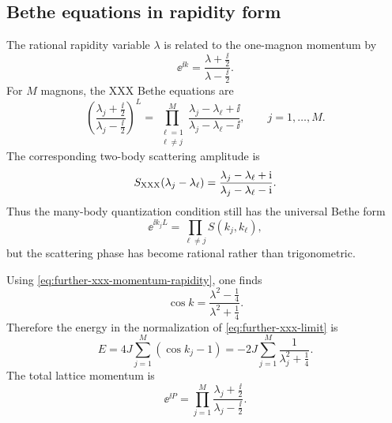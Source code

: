 \subsection{Bethe equations in rapidity form}
\label{subsec:further-xxx-bethe-equations}

The rational rapidity variable $\lambda$ is related to the one-magnon momentum
by
\begin{equation}
\label{eq:further-xxx-momentum-rapidity}
    \ee^{\ii k}
    =
    \frac{\lambda+\frac{\ii}{2}}{\lambda-\frac{\ii}{2}}.
\end{equation}
For $M$ magnons, the XXX Bethe equations are
\begin{equation}
\label{eq:further-xxx-bethe-equations}
    \left(
        \frac{\lambda_j+\frac{\ii}{2}}
             {\lambda_j-\frac{\ii}{2}}
    \right)^L
    =
    \prod_{\substack{\ell=1\\ \ell\neq j}}^{M}
    \frac{\lambda_j-\lambda_\ell+\ii}
         {\lambda_j-\lambda_\ell-\ii},
    \qquad
    j=1,\ldots,M .
\end{equation}
The corresponding two-body scattering amplitude is
\begin{equation}
\label{eq:further-xxx-two-body-S}
    S_{\rm XXX}(\lambda_j-\lambda_\ell)
    =
    \frac{\lambda_j-\lambda_\ell+\mathrm{i}}
         {\lambda_j-\lambda_\ell-\mathrm{i}}.
\end{equation}
Thus the many-body quantization condition still has the universal Bethe form
\begin{equation}
\label{eq:further-general-bethe-quantization}
    \ee^{\ii k_jL}
    =
    \prod_{\ell\neq j}S(k_j,k_\ell),
\end{equation}
but the scattering phase has become rational rather than trigonometric.

Using \cref{eq:further-xxx-momentum-rapidity}, one finds
\begin{equation}
\label{eq:further-xxx-cos-rapidity}
    \cos k
    =
    \frac{\lambda^2-\frac14}{\lambda^2+\frac14}.
\end{equation}
Therefore the energy in the normalization of \cref{eq:further-xxx-limit} is
\begin{equation}
\label{eq:further-xxx-energy}
    E
    =
    4J\sum_{j=1}^{M}(\cos k_j-1)
    =
    -2J\sum_{j=1}^{M}
    \frac{1}{\lambda_j^2+\frac14}.
\end{equation}
The total lattice momentum is
\begin{equation}
\label{eq:further-xxx-total-momentum}
    \ee^{\ii P}
    =
    \prod_{j=1}^{M}
    \frac{\lambda_j+\frac{\ii}{2}}
         {\lambda_j-\frac{\ii}{2}}.
\end{equation}

